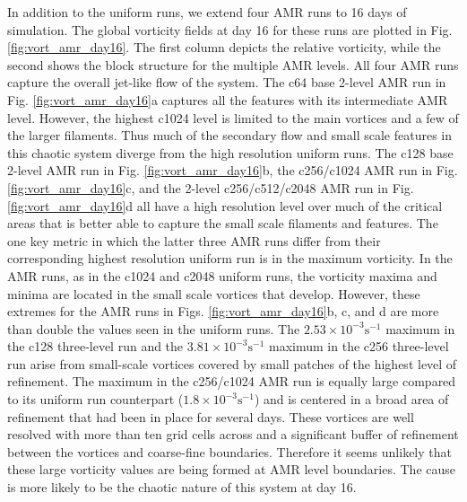 \documentclass{ametsoc}
\begin{document}
In addition to the uniform runs, we extend four AMR runs to 16 days of simulation. 
The global vorticity fields at day 16 for these runs are plotted in 
Fig. \ref{fig:vort_amr_day16}. The first column depicts the relative vorticity,
while the second shows the block structure for the multiple AMR levels.
All four AMR runs capture the overall jet-like flow of the system.
The c64 base 2-level AMR run in Fig. \ref{fig:vort_amr_day16}a captures all the features
with its intermediate AMR level. However, the highest c1024 level is limited to the main vortices
and a few of the larger filaments. Thus much of the secondary flow and 
small scale features in this chaotic system diverge from 
the high resolution uniform runs. The c128 base
2-level AMR run in Fig. \ref{fig:vort_amr_day16}b, the c256/c1024 AMR run in Fig. 
\ref{fig:vort_amr_day16}c, and the 2-level c256/c512/c2048 AMR run in Fig.
\ref{fig:vort_amr_day16}d all have a high resolution level over much of the critical areas that
is better able to capture the small scale filaments and 
features. The one key metric in which the latter 
three AMR runs differ from their corresponding highest resolution
uniform run is in the maximum vorticity. In the AMR runs, as in the c1024 and c2048 
uniform runs, the vorticity maxima and minima are located in the small scale vortices
that develop. However, these extremes for the AMR runs in Figs. 
\ref{fig:vort_amr_day16}b, c, and d are more than double the values seen in the uniform runs.
The $2.53 \times 10^{-3}\mathrm{s}^{-1}$ maximum in the c128 three-level run and
the $3.81 \times 10^{-3}\mathrm{s}^{-1}$ maximum in the c256 three-level run arise
from small-scale vortices covered by small patches of the 
highest level of refinement.  The maximum in the c256/c1024 AMR run
is equally large compared to its uniform run counterpart  
($1.8 \times 10^{-3}\mathrm{s}^{-1}$) and is centered
in a broad area of refinement that had been in place for several days. These vortices
are well resolved with more than ten grid cells across and a significant buffer of refinement between the
vortices and coarse-fine boundaries. Therefore it
seems unlikely that these large vorticity values are being formed at AMR level boundaries.
The cause is more likely to be the chaotic nature of this system at day 16.

\end{document}
